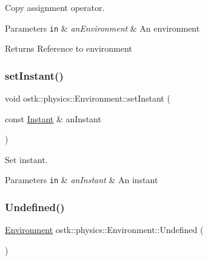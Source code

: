 Copy assignment operator. 


\begin{DoxyParams}[1]{Parameters}
\mbox{\tt in}  & {\em an\+Environment} & An environment \\
\hline
\end{DoxyParams}
\begin{DoxyReturn}{Returns}
Reference to environment 
\end{DoxyReturn}
\mbox{\label{classostk_1_1physics_1_1_environment_aeb00f7751b4c1435ddc584da7b3b22e7}} 
\subsubsection{\texorpdfstring{set\+Instant()}{setInstant()}}
{\footnotesize\ttfamily void ostk\+::physics\+::\+Environment\+::set\+Instant (\begin{DoxyParamCaption}\item[{const \hyperlink{classostk_1_1physics_1_1time_1_1_instant}{Instant} \&}]{an\+Instant }\end{DoxyParamCaption})}



Set instant. 


\begin{DoxyParams}[1]{Parameters}
\mbox{\tt in}  & {\em an\+Instant} & An instant \\
\hline
\end{DoxyParams}
\mbox{\label{classostk_1_1physics_1_1_environment_a0a6b08b9a19de02e9eeacdb0fcc0c588}} 
\subsubsection{\texorpdfstring{Undefined()}{Undefined()}}
{\footnotesize\ttfamily \hyperlink{classostk_1_1physics_1_1_environment}{Environment} ostk\+::physics\+::\+Environment\+::\+Undefined (\begin{DoxyParamCaption}{ }\end{DoxyParamCaption})\hspace{0.3cm}{\ttfamily [static]}}



